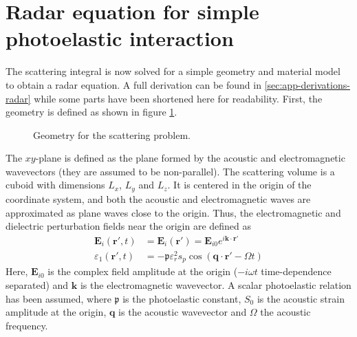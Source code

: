 \documentclass[11pt,twoside]{eitExjobb}
\begin{document}
	\section{Radar equation for simple photoelastic interaction \label{sec:analytical-radar}}
	The scattering integral is now solved for a simple geometry and material model to obtain a radar equation. A full derivation can be found in \ref{sec:app-derivations-radar} while some parts have been shortened here for readability. First, the geometry is defined as shown in figure \ref{fig:radareq-geom-main}.
	\begin{figure}[h]
		\centering
		\resizebox{\textwidth}{!}{
			
		}
		\caption{\label{fig:radareq-geom-main} Geometry for the scattering problem.}
	\end{figure}
	The $xy$-plane is defined as the plane formed by the acoustic and electromagnetic wavevectors (they are assumed to be non-parallel). The scattering volume is a cuboid with dimensions $L_x$, $L_y$ and $L_z$. It is centered in the origin of the coordinate system, and both the acoustic and electromagnetic waves are approximated as plane waves close to the origin. Thus, the electromagnetic and dielectric perturbation fields near the origin are defined as
	\begin{align}
		\bm{E}_i (\bm{r}',t) &= \bm{E}_i (\bm{r}') = \bm{E}_{i0} e^{i\bm{k}\cdot\bm{r}'} \label{eq:an-radar-planeE} \\
		\varepsilon_1 (\bm{r}',t) &= -\mathfrak{p} \varepsilon_r^2 s_p \cos(\bm{q} \cdot \bm{r}' - \Omega t) \label{eq:an-radar-planeEps}
	\end{align}
	Here, $\bm{E}_{i0}$ is the complex field amplitude at the origin ($-i\omega t$ time-dependence separated) and $\bm{k}$ is the electromagnetic wavevector. A scalar photoelastic relation has been assumed, where $\mathfrak{p}$ is the photoelastic constant, $S_0$ is the acoustic strain amplitude at the origin, $\bm{q}$ is the acoustic wavevector and $\Omega$ the acoustic frequency.
	
\end{document}
